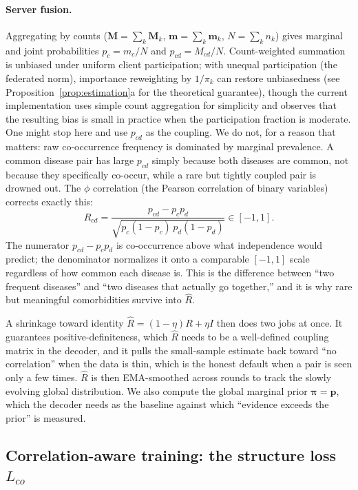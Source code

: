 \documentclass[11pt,a4paper]{article}
\theoremstyle{definition}
\newcommand{\Rhat}{\widehat{R}}
\begin{document}
\paragraph{Server fusion.} Aggregating by counts ($\mathbf{M}=\sum_k\mathbf{M}_k$, $\mathbf{m}=\sum_k\mathbf{m}_k$, $N=\sum_k n_k$) gives marginal and joint probabilities $p_c=m_c/N$ and $p_{cd}=M_{cd}/N$. Count-weighted summation is unbiased under uniform client participation; with unequal participation (the federated norm), importance reweighting by $1/\pi_k$ can restore unbiasedness (see Proposition~\ref{prop:estimation}a for the theoretical guarantee), though the current implementation uses simple count aggregation for simplicity and observes that the resulting bias is small in practice when the participation fraction is moderate. One might stop here and use $p_{cd}$ as the coupling. We do not, for a reason that matters: raw co-occurrence frequency is dominated by marginal prevalence. A common disease pair has large $p_{cd}$ simply because both diseases are common, not because they specifically co-occur, while a rare but tightly coupled pair is drowned out. The $\phi$ correlation (the Pearson correlation of binary variables) corrects exactly this:
\begin{equation}
R_{cd}=\frac{p_{cd}-p_c p_d}{\sqrt{p_c(1-p_c)\,p_d(1-p_d)}}\in[-1,1].
\label{eq:phi}
\end{equation}
The numerator $p_{cd}-p_c p_d$ is co-occurrence above what independence would predict; the denominator normalizes it onto a comparable $[-1,1]$ scale regardless of how common each disease is. This is the difference between ``two frequent diseases'' and ``two diseases that actually go together,'' and it is why rare but meaningful comorbidities survive into $\Rhat$.

A shrinkage toward identity $\Rhat=(1-\eta)R+\eta I$ then does two jobs at once. It guarantees positive-definiteness, which $\Rhat$ needs to be a well-defined coupling matrix in the decoder, and it pulls the small-sample estimate back toward ``no correlation'' when the data is thin, which is the honest default when a pair is seen only a few times. $\Rhat$ is then EMA-smoothed across rounds to track the slowly evolving global distribution. We also compute the global marginal prior $\boldsymbol\pi=\mathbf{p}$, which the decoder needs as the baseline against which ``evidence exceeds the prior'' is measured.

\subsection{Correlation-aware training: the structure loss $L_{co}$}
\label{sec:lco}
\end{document}
